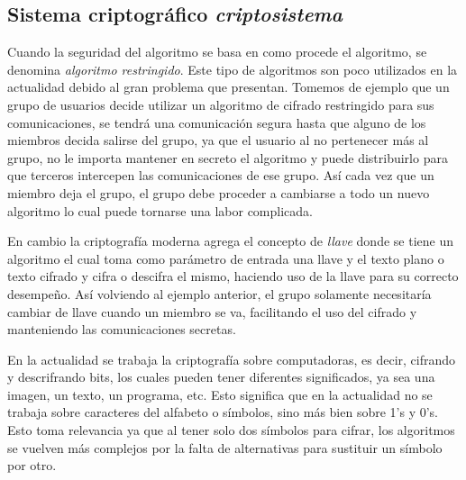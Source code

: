 \subsection{Sistema criptográfico \textit{criptosistema}}
Cuando la seguridad del algoritmo se basa en como procede el algoritmo, se denomina \textit{algoritmo restringido}. Este tipo de algoritmos son poco utilizados en la actualidad debido al gran problema que presentan. Tomemos de ejemplo que un grupo de usuarios decide utilizar un algoritmo de cifrado restringido para sus comunicaciones, se tendrá una comunicación segura hasta que alguno de los miembros decida salirse del grupo, ya que el usuario al no pertenecer más al grupo, no le importa mantener en secreto el algoritmo y puede distribuirlo para que terceros intercepen las comunicaciones de ese grupo. Así cada vez que un miembro deja el grupo, el grupo debe proceder a cambiarse a todo un nuevo algoritmo lo cual puede tornarse una labor complicada.

En cambio la criptografía moderna agrega el concepto de \textit{llave} donde se tiene un algoritmo el cual toma como parámetro de entrada una llave y el texto plano o texto cifrado y cifra o descifra el mismo, haciendo uso de la llave para su correcto desempeño. Así volviendo al ejemplo anterior, el grupo solamente necesitaría cambiar de llave cuando un miembro se va, facilitando el uso del cifrado y manteniendo las comunicaciones secretas.







En la actualidad se trabaja la criptografía sobre computadoras, es decir, cifrando y descrifrando bits, los cuales pueden tener diferentes significados, ya sea una imagen, un texto, un programa, etc. Esto significa que en la actualidad no se trabaja sobre caracteres del alfabeto o símbolos, sino más bien sobre 1's y 0's. Esto toma relevancia ya que al tener solo dos símbolos para cifrar, los algoritmos se vuelven más complejos por la falta de alternativas para sustituir un símbolo por otro.



